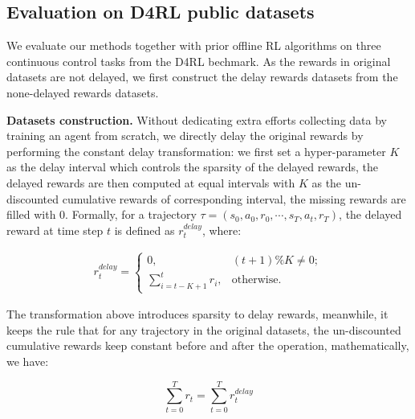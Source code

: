\subsection{Evaluation on D4RL public datasets}

We evaluate our methods together with prior offline RL algorithms on three continuous control tasks from the D4RL bechmark. As the rewards in original datasets are not delayed, we first construct the delay rewards datasets from the none-delayed rewards datasets.

\textbf{Datasets construction.} Without dedicating extra efforts collecting data by training an agent from scratch, we directly delay the original rewards by performing the constant delay transformation: we first set a hyper-parameter $K$ as the delay interval which controls the sparsity of the delayed rewards, the delayed rewards are then computed at equal intervals with $K$ as the un-discounted cumulative rewards of corresponding interval, the missing rewards are filled with 0. 
Formally, for a trajectory $\tau = \left(s_0, a_0, r_0, \cdots, s_T, a_t, r_T\right)$, the delayed reward at time step $t$ is defined as $r_t^{delay}$, where:

$$
\begin{aligned}
r_t^{delay} = \begin{cases}
0, & \left(t + 1\right) \% K \neq 0; \\
\sum_{i = t - K + 1}^t r_i, & \text{otherwise}.
\end{cases}
\end{aligned}
$$

The transformation above introduces sparsity to delay rewards, meanwhile, it keeps the rule that for any trajectory in the original datasets, the un-discounted cumulative rewards keep constant before and after the operation, mathematically, we have:

$$
\sum_{t = 0}^{T} r_t = \sum_{t = 0}^{T} r_t^{delay}
$$

